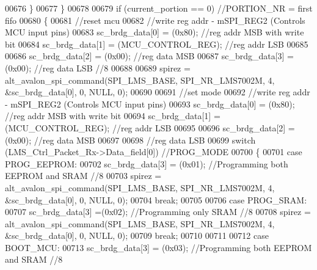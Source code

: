 \begin{DoxyCode}
00676                         \}
00677                     \}
00678 
00679                     \textcolor{keywordflow}{if} (current_portion == 0) \textcolor{comment}{//PORTION\_NR = first fifo}
00680                     \{
00681                         \textcolor{comment}{//reset mcu}
00682                         \textcolor{comment}{//write reg addr - mSPI\_REG2 (Controls MCU input pins)}
00683                         sc_brdg_data[0] = (0x80); \textcolor{comment}{//reg addr MSB with write bit}
00684                         sc_brdg_data[1] = (MCU_CONTROL_REG); \textcolor{comment}{//reg addr LSB}
00685 
00686                         sc_brdg_data[2] = (0x00); \textcolor{comment}{//reg data MSB}
00687                         sc_brdg_data[3] = (0x00); \textcolor{comment}{//reg data LSB //8}
00688 
00689                         spirez = alt_avalon_spi_command(SPI_LMS_BASE, 
      SPI_NR_LMS7002M, 4, &sc_brdg_data[0], 0, NULL, 0);
00690 
00691                         \textcolor{comment}{//set mode}
00692                         \textcolor{comment}{//write reg addr - mSPI\_REG2 (Controls MCU input pins)}
00693                         sc_brdg_data[0] = (0x80); \textcolor{comment}{//reg addr MSB with write bit}
00694                         sc_brdg_data[1] = (MCU_CONTROL_REG); \textcolor{comment}{//reg addr LSB}
00695 
00696                         sc_brdg_data[2] = (0x00); \textcolor{comment}{//reg data MSB}
00697 
00698                         \textcolor{comment}{//reg data LSB}
00699                         \textcolor{keywordflow}{switch} (LMS\_Ctrl\_Packet\_Rx->Data_field[0]) \textcolor{comment}{//PROG\_MODE}
00700                         \{
00701                             \textcolor{keywordflow}{case} PROG_EEPROM:
00702                                 sc_brdg_data[3] = (0x01); \textcolor{comment}{//Programming both EEPROM and SRAM  //8}
00703                                 spirez = alt_avalon_spi_command(SPI_LMS_BASE, 
      SPI_NR_LMS7002M, 4, &sc_brdg_data[0], 0, NULL, 0);
00704                                 \textcolor{keywordflow}{break};
00705 
00706                             \textcolor{keywordflow}{case} PROG_SRAM:
00707                                 sc_brdg_data[3] =(0x02); \textcolor{comment}{//Programming only SRAM  //8}
00708                                 spirez = alt_avalon_spi_command(SPI_LMS_BASE, 
      SPI_NR_LMS7002M, 4, &sc_brdg_data[0], 0, NULL, 0);
00709                                 \textcolor{keywordflow}{break};
00710 
00711 
00712                             \textcolor{keywordflow}{case} BOOT_MCU:
00713                                 sc_brdg_data[3] = (0x03); \textcolor{comment}{//Programming both EEPROM and SRAM  //8}

\end{DoxyCode}
